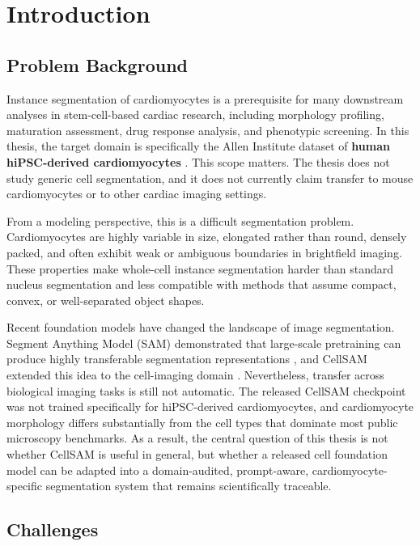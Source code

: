 \section{Introduction}\label{introduction}

\subsection{Problem Background}\label{problem-background}

Instance segmentation of cardiomyocytes is a prerequisite for many downstream analyses in stem-cell-based cardiac research, including morphology profiling, maturation assessment, drug response analysis, and phenotypic screening. In this thesis, the target domain is specifically the Allen Institute dataset of \textbf{human hiPSC-derived cardiomyocytes} \cite{rafelski2024allen}. This scope matters. The thesis does not study generic cell segmentation, and it does not currently claim transfer to mouse cardiomyocytes or to other cardiac imaging settings.

From a modeling perspective, this is a difficult segmentation problem. Cardiomyocytes are highly variable in size, elongated rather than round, densely packed, and often exhibit weak or ambiguous boundaries in brightfield imaging. These properties make whole-cell instance segmentation harder than standard nucleus segmentation and less compatible with methods that assume compact, convex, or well-separated object shapes.

Recent foundation models have changed the landscape of image segmentation. Segment Anything Model (SAM) demonstrated that large-scale pretraining can produce highly transferable segmentation representations \cite{kirillov2023sam}, and CellSAM extended this idea to the cell-imaging domain \cite{israel2024cellsam}. Nevertheless, transfer across biological imaging tasks is still not automatic. The released CellSAM checkpoint was not trained specifically for hiPSC-derived cardiomyocytes, and cardiomyocyte morphology differs substantially from the cell types that dominate most public microscopy benchmarks. As a result, the central question of this thesis is not whether CellSAM is useful in general, but whether a released cell foundation model can be adapted into a domain-audited, prompt-aware, cardiomyocyte-specific segmentation system that remains scientifically traceable.

\subsection{Challenges}\label{challenges}

